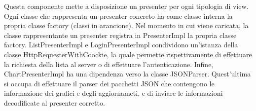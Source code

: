 Questa componente mette a disposizione un presenter per ogni tipologia di view. Ogni classe che rappresenta un presenter concreto ha come classe interna la propria classe factory (classi in arancione). Nel momento in cui viene caricata, la classe rappresentante un presenter registra in PresenterImpl la propria classe factory. ListPresenterImpl e LoginPresenterImpl condividono un'istanza della classe HttpRequesterWithCoockie, la quale permette rispettivamente di effettuare la richiesta della lista al server o di effettuare l'autenticazione. 
Infine, ChartPresenterImpl ha una dipendenza verso la classe JSONParser. Quest'ultima si occupa di effettuare il parser dei pacchetti JSON che contengono le informazione dei grafici e degli aggiornameti, e di inviare le informazioni decodificate al presenter corretto.
